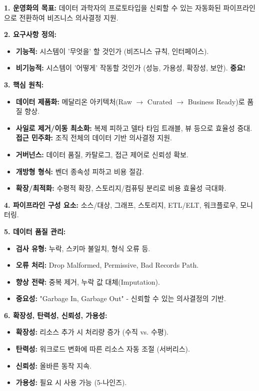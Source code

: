 \documentclass[11pt,a4paper]{article}
\theoremstyle{definition}
\begin{document}
\begin{enumerate}
\begin{tcolorbox}[summarybox]
\textbf{1. 운영화의 목표:} 데이터 과학자의 프로토타입을 신뢰할 수 있는 자동화된 파이프라인으로 전환하여 비즈니스 의사결정 지원.

\textbf{2. 요구사항 정의:}
\begin{itemize}
    \item \textbf{기능적:} 시스템이 '무엇을' 할 것인가 (비즈니스 규칙, 인터페이스).
    \item \textbf{비기능적:} 시스템이 '어떻게' 작동할 것인가 (성능, 가용성, 확장성, 보안). \textbf{중요!}
\end{itemize}

\textbf{3. 핵심 원칙:}
\begin{itemize}
    \item \textbf{데이터 제품화:} 메달리온 아키텍처(Raw $\rightarrow$ Curated $\rightarrow$ Business Ready)로 품질 향상.
    \item \textbf{사일로 제거/이동 최소화:} 복제 피하고 델타 타임 트래블, 뷰 등으로 효율성 증대.
    \textbf{접근 민주화:} 조직 전체의 데이터 기반 의사결정 지원.
    \item \textbf{거버넌스:} 데이터 품질, 카탈로그, 접근 제어로 신뢰성 확보.
    \item \textbf{개방형 형식:} 벤더 종속성 피하고 비용 절감.
    \item \textbf{확장/최적화:} 수평적 확장, 스토리지/컴퓨팅 분리로 비용 효율성 극대화.
\end{itemize}

\textbf{4. 파이프라인 구성 요소:} 소스/대상, 그래프, 스토리지, ETL/ELT, 워크플로우, 모니터링.

\textbf{5. 데이터 품질 관리:}
\begin{itemize}
    \item \textbf{검사 유형:} 누락, 스키마 불일치, 형식 오류 등.
    \item \textbf{오류 처리:} Drop Malformed, Permissive, Bad Records Path.
    \item \textbf{향상 전략:} 중복 제거, 누락 값 대체(Imputation).
    \item \textbf{중요성:} "Garbage In, Garbage Out" - 신뢰할 수 있는 의사결정의 기반.
\end{itemize}

\textbf{6. 확장성, 탄력성, 신뢰성, 가용성:}
\begin{itemize}
    \item \textbf{확장성:} 리소스 추가 시 처리량 증가 (수직 vs. 수평).
    \item \textbf{탄력성:} 워크로드 변화에 따른 리소스 자동 조절 (서버리스).
    \item \textbf{신뢰성:} 올바른 동작 지속.
    \item \textbf{가용성:} 필요 시 사용 가능 (5-나인즈).
\end{itemize}


\end{tcolorbox}
\end{enumerate}
\end{document}
